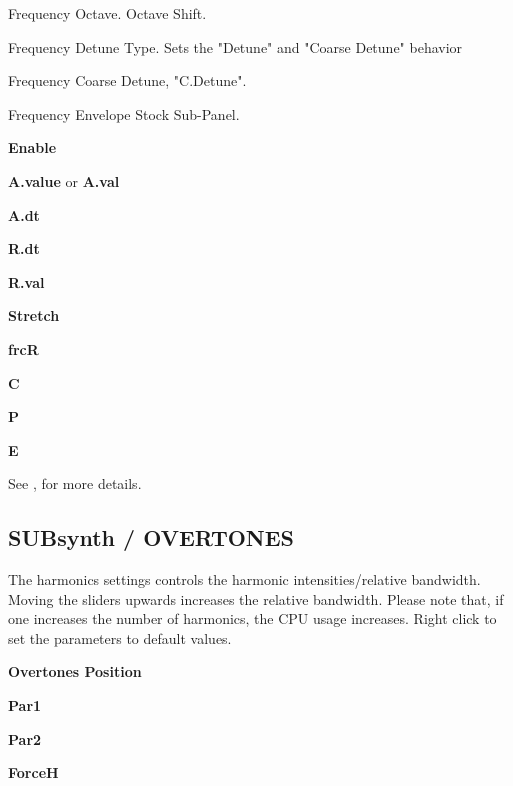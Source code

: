    Frequency Octave.
   Octave Shift.

   Frequency Detune Type.
   Sets the "Detune" and "Coarse Detune" behavior

   Frequency Coarse Detune, "C.Detune".

   Frequency Envelope Stock Sub-Panel.

   \begin{enumber}
      \item \textbf{Enable}
      \item \textbf{A.value} or \textbf{A.val}
      \item \textbf{A.dt}
      \item \textbf{R.dt}
      \item \textbf{R.val}
      \item \textbf{Stretch}
      \item \textbf{frcR}
      \item \textbf{C}
      \item \textbf{P}
      \item \textbf{E}
   \end{enumber}

   See , for more details.

\subsection{SUBsynth / OVERTONES}
\label{subsec:subsynth_overtones}

The harmonics settings controls the harmonic intensities/relative bandwidth.
Moving the sliders upwards increases the relative bandwidth.  Please note
that, if one increases the number of harmonics, the CPU usage increases. Right
click to set the parameters to default values.

   \begin{enumber}
      \item \textbf{Overtones Position}
      \item \textbf{Par1}
      \item \textbf{Par2}
      \item \textbf{ForceH}
   \end{enumber}

   \setcounter{ItemCounter}{0}      %

